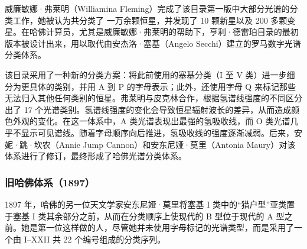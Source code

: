 威廉敏娜·弗莱明（Williamina Fleming）完成了该目录第一版中大部分光谱的分类工作，她被认为共分类了 一万余颗恒星，并发现了 10 颗新星以及 200 多颗变星。在哈佛计算员，尤其是威廉敏娜·弗莱明的帮助下，亨利·德雷珀目录的最初版本被设计出来，用以取代由安杰洛·塞基（Angelo Secchi）建立的罗马数字光谱分类体系。

该目录采用了一种新的分类方案：将此前使用的塞基分类（I 至 V 类）进一步细分为更具体的类别，并用 A 到 P 的字母表示；此外，还使用字母 Q 来标记那些无法归入其他任何类别的恒星。弗莱明与皮克林合作，根据氢谱线强度的不同区分出了 17 个光谱类别。氢谱线强度的变化会导致恒星辐射波长的差异，从而造成颜色外观的变化。在这一体系中，A 类光谱表现出最强的氢吸收线，而 O 类光谱几乎不显示可见谱线。随着字母顺序向后推进，氢吸收线的强度逐渐减弱。后来，安妮·跳·坎农（Annie Jump Cannon）和安东尼娅·莫里（Antonia Maury）对该体系进行了修订，最终形成了哈佛光谱分类体系。
\subsubsection{旧哈佛体系（1897）}
1897 年，哈佛的另一位天文学家安东尼娅·莫里将塞基 I 类中的“猎户型”亚类置于塞基 I 类其余部分之前，从而在分类顺序上使现代的 B 型位于现代的 A 型之前。她是第一位这样做的人，尽管她并未使用字母标记的光谱类型，而是采用了一个由 I–XXII 共 22 个编号组成的分类序列。
